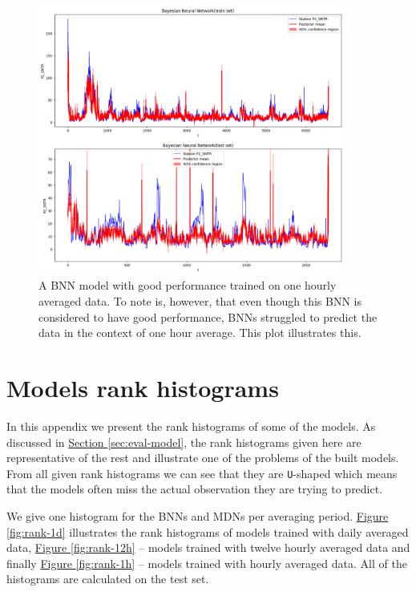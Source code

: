\documentclass[12pt,a4paper,twoside]{scrartcl}
\numberwithin{equation}{section}
\newcommand{\reffig}[1]{\hyperref[#1]{Figure \ref*{#1}}}
\newcommand{\refsec}[1]{\hyperref[#1]{Section \ref*{#1}}}
\newcounter{mypagecount}%
\newenvironment{interlude}{%
  \clearpage
  \setcounter{mypagecount}{\value{page}}%
  \thispagestyle{empty}%
  \pagestyle{empty}%
}{%
  \clearpage
  \setcounter{page}{\value{mypagecount}}%
}
\let\chapter=\section %
\begin{document}
\begin{interlude}
\begin{appendices}
\begin{center}
\begin{figure}[htpb]
        \includegraphics[height=0.6\textwidth, width=0.9\textwidth]{figures/model_plots/bnn_1h}
        \caption[BNN one hour plot]{A BNN model with good performance trained on one hourly averaged data. To note is, however, that even though this BNN is considered to have good performance, BNNs struggled to predict the data in the context of one hour average. This plot illustrates this.}\label{fig:bnn-plot-1h}
      \end{figure}
    \end{center}
    \vfill
    \clearpage
    \chapter{Models rank histograms}\label{app:g}
    In this appendix we present the rank histograms of some of the models. As discussed in \refsec{sec:eval-model}, the rank histograms given here are representative of the rest and illustrate one of the problems of the built models. From all given rank histograms we can see that they are \texttt{U}-shaped which means that the models often miss the actual observation they are trying to predict.
    
    We give one histogram for the BNNs and MDNs per averaging period. \reffig{fig:rank-1d} illustrates the rank histograms of models trained with daily averaged data, \reffig{fig:rank-12h} -- models trained with twelve hourly averaged data and finally \reffig{fig:rank-1h} -- models trained with hourly averaged data. All of the histograms are calculated on the test set.
    

\end{appendices}
\end{interlude}
\end{document}
